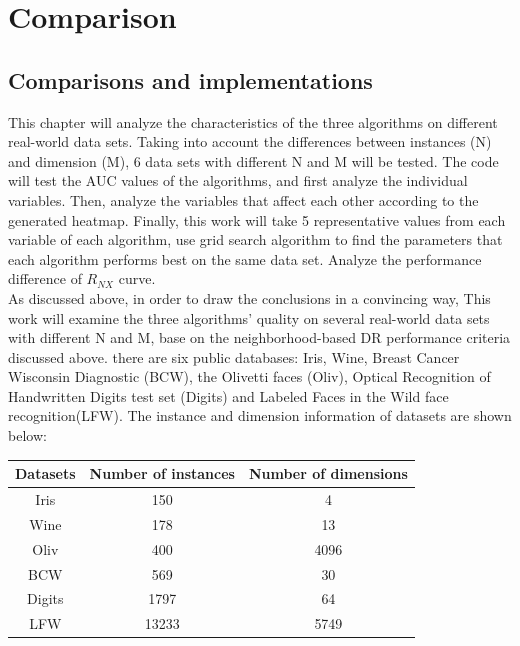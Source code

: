 \part{Comparison} \label{part:Comparison and implementation}

\chapter{Comparisons and implementations}

This chapter will analyze the characteristics of the three algorithms on different real-world data sets. Taking into account the differences between instances (N) and dimension (M), 6 data sets with different N and M will be tested. The code will test the AUC values of the algorithms, and first analyze the individual variables. Then, analyze the variables that affect each other according to the generated heatmap. Finally, this work will take 5 representative values from each variable of each algorithm, use grid search algorithm to find the parameters that each algorithm performs best on the same data set. Analyze the performance difference of $R_{NX}$ curve.\\

\noindent As discussed above, in order to draw the conclusions in a convincing way, This work will examine the three algorithms' quality on several real-world data sets with different N and M, base on the neighborhood-based DR performance criteria discussed above. there are six public databases: Iris, Wine, Breast Cancer Wisconsin Diagnostic (BCW), the Olivetti faces (Oliv), Optical Recognition of Handwritten Digits test set (Digits) and Labeled Faces in the Wild face recognition(LFW). The instance and dimension information of datasets are shown below:\\

\begin{center}
\begin{tabular}{|c|c|c|}%
\hline  %
Datasets & Number of instances & Number of dimensions\\
\hline  %
Iris & 150 & 4\\
\hline  %
Wine & 178 & 13\\
\hline  %
Oliv & 400 & 4096\\
\hline  %
BCW & 569 & 30\\
\hline  %
Digits & 1797 & 64\\
\hline  %
LFW & 13233 & 5749\\
\hline %
\end{tabular}\\
\end{center}
\\

